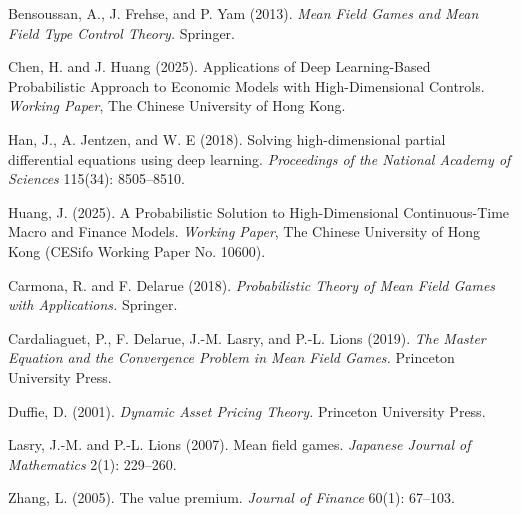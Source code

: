 \documentclass[11pt,letterpaper,oneside]{article}
\begin{document}
\begin{thebibliography}{99}\small

 Bensoussan, A., J. Frehse, and P. Yam (2013).
\emph{Mean Field Games and Mean Field Type Control Theory.}
Springer.

 Chen, H. and J. Huang (2025).
Applications of Deep Learning-Based Probabilistic Approach to Economic Models with High-Dimensional Controls.
\emph{Working Paper}, The Chinese University of Hong Kong.

 Han, J., A. Jentzen, and W. E (2018).
Solving high-dimensional partial differential equations using deep learning.
\emph{Proceedings of the National Academy of Sciences} 115(34): 8505--8510.

 Huang, J. (2025).
A Probabilistic Solution to High-Dimensional Continuous-Time Macro and Finance Models.
\emph{Working Paper}, The Chinese University of Hong Kong (CESifo Working Paper No. 10600).

 Carmona, R. and F. Delarue (2018).
\emph{Probabilistic Theory of Mean Field Games with Applications.}
Springer.

 Cardaliaguet, P., F. Delarue, J.-M. Lasry, and P.-L. Lions (2019).
\emph{The Master Equation and the Convergence Problem in Mean Field Games.}
Princeton University Press.

 Duffie, D. (2001).
\emph{Dynamic Asset Pricing Theory.}
Princeton University Press.

 Lasry, J.-M. and P.-L. Lions (2007).
Mean field games.
\emph{Japanese Journal of Mathematics} 2(1): 229--260.

 Zhang, L. (2005).
The value premium.
\emph{Journal of Finance} 60(1): 67--103.

\end{thebibliography}
\end{document}
